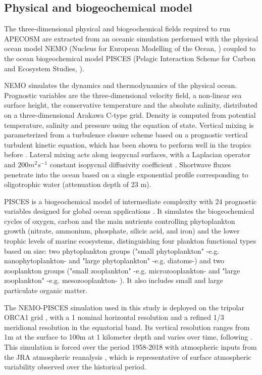 \subsection{Physical and biogeochemical model}
\label{sec:nemo}

The three-dimensional physical and biogeochemical fields required to run APECOSM are extracted from an oceanic simulation performed with the physical ocean model NEMO (Nucleus for European Modelling of the Ocean, \citealp{madecNEMOOceanEngine2019}) coupled to the ocean biogeochemical model PISCES (Pelagic Interaction Scheme for Carbon and Ecosystem Studies, \citealp{aumontPISCESv2OceanBiogeochemical2015}). 

NEMO simulates the dynamics and thermodynamics of the physical ocean. Prognostic variables are
the three-dimensional velocity field, a non-linear sea surface height, the
conservative temperature and the absolute salinity, distributed on a three-dimensional Arakawa C-type grid. Density is computed from potential temperature, salinity and pressure using the \cite{iocInternationalThermodynamicEquation2010} equation of state. Vertical mixing is parameterized from a turbulence closure scheme based on a prognostic vertical turbulent kinetic equation, which has been shown to perform well in the tropics before \citep{blankeVariabilityTropicalAtlantic1993}. Lateral mixing acts along isopycnal surfaces, with a Laplacian operator and $200 m^2 s^{-1}$ constant isopycnal diffusivity coefficient \citep{lengaigneImpactIsopycnalMixing2003}. Shortwave fluxes penetrate into the ocean based on a single exponential profile \citep{paulsonIrradianceMeasurementsUpper1977} corresponding to oligotrophic water (attenuation depth of 23 m). 

PISCES is a biogeochemical model of intermediate complexity with 24 prognostic variables designed for global ocean applications \citep{aumontPISCESv2OceanBiogeochemical2015}. It simulates the biogeochemical cycles of oxygen, carbon and the main nutrients controlling phytoplankton growth (nitrate, ammonium, phosphate, silicic acid, and iron) and the lower trophic levels of marine ecosystems, distinguishing four plankton functional types based on size: two phytoplankton groups ("small phytoplankton" -e.g. nanophytoplankton- and "large phytoplankton" -e.g. diatoms-) and two zooplankton groups ("small zooplankton" -e.g. microzooplankton- and "large zooplankton" -e.g. mesozooplankton- ). It also includes small and large particulate organic matter.

The NEMO-PISCES simulation used in this study is deployed on the tripolar ORCA1 grid \citep{madecGlobalOceanMesh1996}, with a 1\degree{} nominal horizontal resolution and a refined 1/3\degree{} meridional resolution in the equatorial band. Its vertical resolution ranges from 1m at the surface to 100m at 1 kilometer depth and varies over time, following \cite{levierFreeSurfaceVariable2007}. This simulation  is forced over the period 1958-2018 with atmospheric inputs from the JRA atmospheric reanalysis \citep{kobayashiJRA55ReanalysisGeneral2015}, which is representative of  surface atmospheric variability observed over the historical period. 

